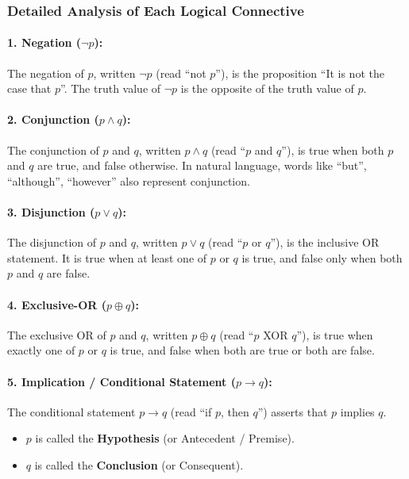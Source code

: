 \documentclass[11pt,a4paper]{article}
\begin{document}
\subsubsection*{Detailed Analysis of Each Logical Connective}

\paragraph{1. Negation ($\neg p$):}
The negation of $p$, written $\neg p$ (read ``not $p$''), is the proposition ``It is not the case that $p$''. The truth value of $\neg p$ is the opposite of the truth value of $p$.

\paragraph{2. Conjunction ($p \land q$):}
The conjunction of $p$ and $q$, written $p \land q$ (read ``$p$ and $q$''), is true when both $p$ and $q$ are true, and false otherwise. In natural language, words like ``but'', ``although'', ``however'' also represent conjunction.

\paragraph{3. Disjunction ($p \lor q$):}
The disjunction of $p$ and $q$, written $p \lor q$ (read ``$p$ or $q$''), is the inclusive OR statement. It is true when at least one of $p$ or $q$ is true, and false only when both $p$ and $q$ are false.

\paragraph{4. Exclusive-OR ($p \oplus q$):}
The exclusive OR of $p$ and $q$, written $p \oplus q$ (read ``$p$ XOR $q$''), is true when exactly one of $p$ or $q$ is true, and false when both are true or both are false.

\paragraph{5. Implication / Conditional Statement ($p \rightarrow q$):}
The conditional statement $p \rightarrow q$ (read ``if $p$, then $q$'') asserts that $p$ implies $q$.
\begin{itemize}[leftmargin=1.5em]
    \item $p$ is called the \textbf{Hypothesis} (or Antecedent / Premise).
    \item $q$ is called the \textbf{Conclusion} (or Consequent).
\end{itemize}
\end{document}
